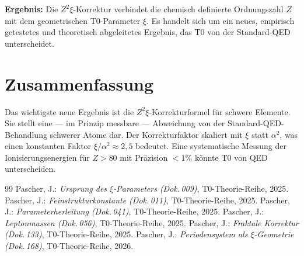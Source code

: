 \textbf{Ergebnis:} Die $Z^2\xi$-Korrektur verbindet die chemisch definierte
Ordnungszahl $Z$ mit dem geometrischen T0-Parameter $\xi$. Es handelt sich
um ein neues, empirisch getestetes und theoretisch abgeleitetes Ergebnis,
das T0 von der Standard-QED unterscheidet.

\section{Zusammenfassung}
\label{sec:169-zusammenfassung}

\begin{table}[htbp]
\centering
\caption{Status der drei Nachfolgeuntersuchungen}
\label{tab:status}
\end{table}

Das wichtigste neue Ergebnis ist die $Z^2\xi$-Korrekturformel für schwere
Elemente. Sie stellt eine — im Prinzip messbare — Abweichung von der
Standard-QED-Behandlung schwerer Atome dar. Der Korrekturfaktor skaliert
mit $\xi$ statt $\alpha^2$, was einen konstanten Faktor $\xi/\alpha^2 \approx 2{,}5$
bedeutet. Eine systematische Messung der Ionisierungsenergien für
$Z > 80$ mit Präzision $<1\%$ könnte T0 von QED unterscheiden.

\begin{thebibliography}{99}
 Pascher, J.: \emph{Ursprung des $\xi$-Parameters (Dok.\,009)},
  T0-Theorie-Reihe, 2025.
 Pascher, J.: \emph{Feinstrukturkonstante (Dok.\,011)},
  T0-Theorie-Reihe, 2025.
 Pascher, J.: \emph{Parameterherleitung (Dok.\,041)},
  T0-Theorie-Reihe, 2025.
 Pascher, J.: \emph{Leptonmassen (Dok.\,056)},
  T0-Theorie-Reihe, 2025.
 Pascher, J.: \emph{Fraktale Korrektur (Dok.\,133)},
  T0-Theorie-Reihe, 2025.
 Pascher, J.: \emph{Periodensystem als $\xi$-Geometrie (Dok.\,168)},
  T0-Theorie-Reihe, 2026.
\end{thebibliography}
